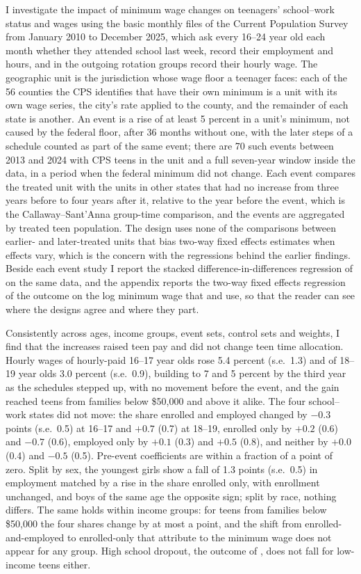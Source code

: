 \documentclass[12pt]{article}
\begin{document}
I investigate the impact of minimum wage changes on teenagers' school--work status and wages using the basic monthly files of the Current Population Survey from January 2010 to December 2025, which ask every 16--24 year old each month whether they attended school last week, record their employment and hours, and in the outgoing rotation groups record their hourly wage. The geographic unit is the jurisdiction whose wage floor a teenager faces: each of the 56 counties the CPS identifies that have their own minimum is a unit with its own wage series, the city's rate applied to the county, and the remainder of each state is another. An event is a rise of at least 5 percent in a unit's minimum, not caused by the federal floor, after 36 months without one, with the later steps of a schedule counted as part of the same event; there are 70 such events between 2013 and 2024 with CPS teens in the unit and a full seven-year window inside the data, in a period when the federal minimum did not change. Each event compares the treated unit with the units in other states that had no increase from three years before to four years after it, relative to the year before the event, which is the Callaway--Sant'Anna group-time comparison, and the events are aggregated by treated teen population. The design uses none of the comparisons between earlier- and later-treated units that bias two-way fixed effects estimates when effects vary, which is the concern with the regressions behind the earlier findings. Beside each event study I report the stacked difference-in-differences regression of \citet{cengiz2019} on the same data, and the appendix reports the two-way fixed effects regression of the outcome on the log minimum wage that \citet{neumark2019} and \citet{smith2021} use, so that the reader can see where the designs agree and where they part.

Consistently across ages, income groups, event sets, control sets and weights, I find that the increases raised teen pay and did not change teen time allocation. Hourly wages of hourly-paid 16--17 year olds rose 5.4 percent (s.e.\ 1.3) and of 18--19 year olds 3.0 percent (s.e.\ 0.9), building to 7 and 5 percent by the third year as the schedules stepped up, with no movement before the event, and the gain reached teens from families below \$50,000 and above it alike. The four school--work states did not move: the share enrolled and employed changed by $-0.3$ points (s.e.\ 0.5) at 16--17 and $+0.7$ (0.7) at 18--19, enrolled only by $+0.2$ (0.6) and $-0.7$ (0.6), employed only by $+0.1$ (0.3) and $+0.5$ (0.8), and neither by $+0.0$ (0.4) and $-0.5$ (0.5). Pre-event coefficients are within a fraction of a point of zero. Split by sex, the youngest girls show a fall of 1.3 points (s.e.\ 0.5) in employment matched by a rise in the share enrolled only, with enrollment unchanged, and boys of the same age the opposite sign; split by race, nothing differs. The same holds within income groups: for teens from families below \$50,000 the four shares change by at most a point, and the shift from enrolled-and-employed to enrolled-only that \citet{neumark2019} attribute to the minimum wage does not appear for any group. High school dropout, the outcome of \citet{smith2021}, does not fall for low-income teens either.
\end{document}
